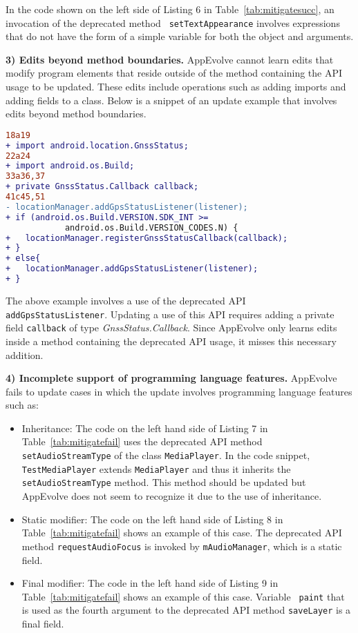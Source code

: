 In the code shown on the left side of Listing 6 in
Table~\ref{tab:mitigatesucc}, an invocation of the deprecated method {\tt
setTextAppearance} involves expressions that do not have the form
of a simple variable for both the object and arguments.

\vspace{0.25\baselineskip}\noindent\textbf{3) Edits beyond method boundaries.} AppEvolve cannot learn edits that modify program elements that reside outside of the method containing the API usage to be updated. These edits include operations such as adding imports and adding fields to a class. Below is a snippet of an update example that involves edits beyond method boundaries.
\begin{lstlisting}[language=diff,numbers=none]
18a19
+ import android.location.GnssStatus;
22a24
+ import android.os.Build;
33a36,37
+ private GnssStatus.Callback callback;
41c45,51
- locationManager.addGpsStatusListener(listener);
+ if (android.os.Build.VERSION.SDK_INT >=
            android.os.Build.VERSION_CODES.N) {
+   locationManager.registerGnssStatusCallback(callback);
+ }
+ else{
+   locationManager.addGpsStatusListener(listener);
+ }
\end{lstlisting}
The above example involves a use of the deprecated API {\tt
addGpsStatusListener}. Updating a use of this API requires adding a private
field {\tt callback} of type {\em GnssStatus.Callback}.
Since AppEvolve only learns edits inside a method containing the deprecated
API usage, it misses this necessary addition.

\vspace{0.25\baselineskip}\noindent\textbf{4) Incomplete support of programming language features.} AppEvolve fails to update cases in which the update involves programming language features such as:
\begin{itemize}
\item Inheritance: The code on the left hand side of Listing 7 in
Table~\ref{tab:mitigatefail} uses the deprecated API method {\tt
set\-Audio\-Stream\-Type} of the class {\tt MediaPlayer}. In the code snippet,
{\tt Test\-Media\-Player} extends {\tt MediaPlayer} and thus it inherits
the {\tt setAudioStreamType} method. This method should be updated but
AppEvolve does not seem to recognize it due to the use of inheritance.
\item Static modifier:  The code on the left hand side of Listing 8 in
Table~\ref{tab:mitigatefail} shows an example of this case.  The deprecated
API method {\tt requestAudioFocus} is invoked by {\tt mAudioManager}, which
is a static field.

\item Final modifier: The code in the left hand side of Listing 9 in
Table~\ref{tab:mitigatefail} shows an example of this case.  Variable {\tt
paint} that is used as the fourth argument to the deprecated API method
{\tt saveLayer} is a final field.

\end{itemize}

